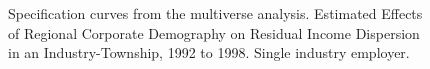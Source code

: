 \documentclass{article}
\begin{document}
\begin{figure}[htbp]
  \centering
    \caption{Specification curves from the multiverse analysis. Estimated Effects of Regional Corporate Demography on Residual Income Dispersion in an Industry-Township, 1992 to 1998.  Single industry employer.}
  \label{fig:gross_income}
  
\end{figure}


\clearpage %
\end{document}
